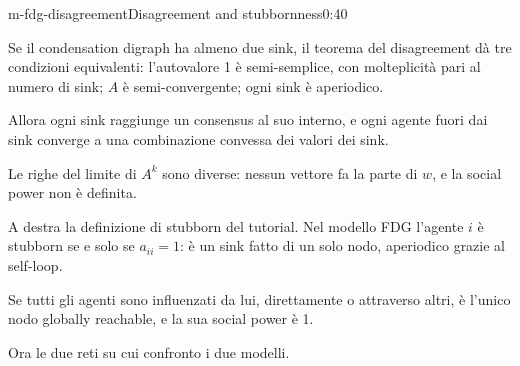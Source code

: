 \begin{slide}{m-fdg-disagreement}{Disagreement and stubbornness}{0:40}
  \begin{discorso}
    \item Se il condensation digraph ha almeno due sink, il teorema del disagreement dà tre condizioni equivalenti: l'autovalore 1 è semi-semplice, con molteplicità pari al numero di sink; $A$ è semi-convergente; ogni sink è aperiodico.
    \item Allora ogni sink raggiunge un consensus al suo interno, e ogni agente fuori dai sink converge a una combinazione convessa dei valori dei sink.
    \item Le righe del limite di $A^k$ sono diverse: nessun vettore fa la parte di $w$, e la social power non è definita.
    \item A destra la definizione di stubborn del tutorial. Nel modello FDG l'agente $i$ è stubborn se e solo se $a_{ii}=1$: è un sink fatto di un solo nodo, aperiodico grazie al self-loop.
    \item Se tutti gli agenti sono influenzati da lui, direttamente o attraverso altri, è l'unico nodo globally reachable, e la sua social power è 1.
    \item Ora le due reti su cui confronto i due modelli.
  \end{discorso}
\end{slide}

